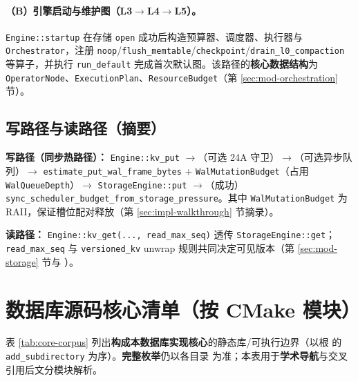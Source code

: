 \paragraph{（B）引擎启动与维护图（L3$\rightarrow$L4$\rightarrow$L5）。}
\texttt{Engine::startup} 在存储 \texttt{open} 成功后构造预算器、调度器、执行器与 \texttt{Orchestrator}，注册 \texttt{noop}/\texttt{flush\_memtable}/\texttt{checkpoint}/\texttt{drain\_l0\_compaction} 等算子，并执行 \texttt{run\_default} 完成首次默认图。该路径的\textbf{核心数据结构}为 \texttt{OperatorNode}、\texttt{ExecutionPlan}、\texttt{ResourceBudget}（第 \ref{sec:mod-orchestration} 节）。

\subsection{写路径与读路径（摘要）}

\textbf{写路径（同步热路径）：} \texttt{Engine::kv\_put} $\rightarrow$（可选 24A 守卫）$\rightarrow$（可选异步队列）$\rightarrow$ \texttt{estimate\_put\_wal\_frame\_bytes} + \texttt{WalMutationBudget}（占用 \texttt{WalQueueDepth}）$\rightarrow$ \texttt{StorageEngine::put} $\rightarrow$（成功）\texttt{sync\_scheduler\_budget\_from\_storage\_pressure}。其中 \texttt{WalMutationBudget} 为 RAII，保证槽位配对释放（第 \ref{sec:impl-walkthrough} 节摘录）。

\textbf{读路径：} \texttt{Engine::kv\_get(..., read\_max\_seq)} 透传 \texttt{StorageEngine::get}；\texttt{read\_max\_seq} 与 \texttt{versioned\_kv} unwrap 规则共同决定可见版本（第 \ref{sec:mod-storage} 节与 ）。

\section{数据库源码核心清单（按 CMake 模块）}
\label{sec:core-corpus}

表 \ref{tab:core-corpus} 列出\textbf{构成本数据库实现核心}的静态库/可执行边界（以根  的 \texttt{add\_subdirectory} 为序）。\textbf{完整枚举}仍以各目录  为准；本表用于\textbf{学术导航}与交叉引用后文分模块解析。

